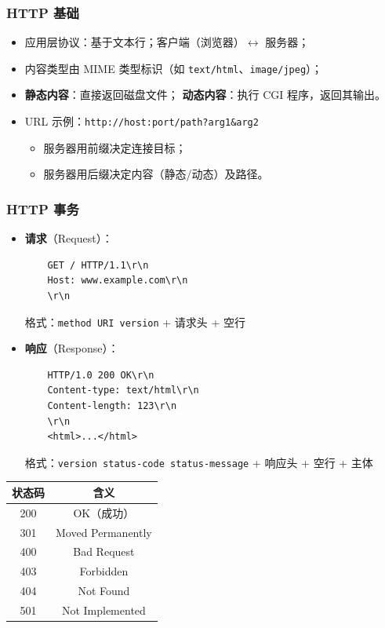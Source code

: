 \subsubsection{HTTP 基础}
\begin{itemize}[leftmargin=*,noitemsep]
    \item 应用层协议：基于文本行；客户端（浏览器）$\leftrightarrow$ 服务器；
    \item 内容类型由 MIME 类型标识（如 \texttt{text/html}、\texttt{image/jpeg}）；
    \item \textbf{静态内容}：直接返回磁盘文件；
          \textbf{动态内容}：执行 CGI 程序，返回其输出。
    \item URL 示例：\texttt{http://host:port/path?arg1\&arg2}
          \begin{itemize}
              \item 服务器用前缀决定连接目标；
              \item 服务器用后缀决定内容（静态/动态）及路径。
          \end{itemize}
\end{itemize}

\subsubsection{HTTP 事务}
\begin{itemize}[leftmargin=*,noitemsep]
    \item \textbf{请求}（Request）：
          \begin{verbatim}
    GET / HTTP/1.1\r\n
    Host: www.example.com\r\n
    \r\n
    \end{verbatim}
          格式：\texttt{method URI version} + 请求头 + 空行

    \item \textbf{响应}（Response）：
          \begin{verbatim}
    HTTP/1.0 200 OK\r\n
    Content-type: text/html\r\n
    Content-length: 123\r\n
    \r\n
    <html>...</html>
    \end{verbatim}
          格式：\texttt{version status-code status-message} + 响应头 + 空行 + 主体
\end{itemize}
\begin{table}[htbp]
    \centering
\begin{tabular}{|c|c|}
    状态码 & 含义                \\
    \hline
    200 & OK（成功）            \\
    301 & Moved Permanently \\
    400 & Bad Request       \\
    403 & Forbidden         \\
    404 & Not Found         \\
    501 & Not Implemented   \\
\end{tabular}
\end{table}

